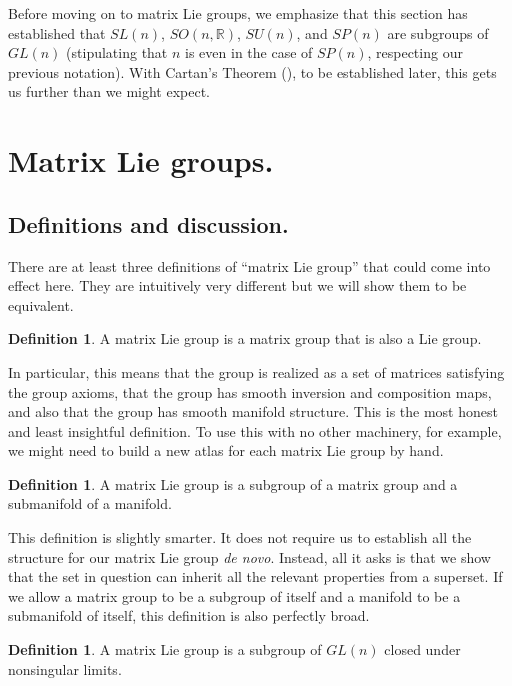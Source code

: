 \documentclass[12pt]{article}
\newcommand{\R}{\mathbb{R}}
\newcommand{\sun}{SU (n)}
\newcommand{\son}{SO (n, \R)}
\theoremstyle{definition}
\theoremstyle{definition}
\theoremstyle{definition}
\theoremstyle{definition}
\theoremstyle{definition}
\newtheorem{defn}[them]{Definition}
\theoremstyle{definition}
\theoremstyle{definition}
\theoremstyle{definition}
\begin{document}
\par{Before moving on to matrix Lie groups, we
emphasize that this section has established that
$SL(n)$, $\son$, $\sun$, and $SP(n)$ are
subgroups of $GL(n)$ (stipulating that $n$ is even
in the case of $SP(n)$, respecting our previous
notation). With Cartan’s Theorem (), to be
established later, this gets us further than
we might expect.}

\section{Matrix Lie groups.}

\subsection{Definitions and discussion.}

\par{There are at least three definitions of
“matrix Lie group” that could come into effect
here. They are intuitively very different but we
will show them to be equivalent.}

\begin{defn}\label{def1}
A matrix Lie group is a matrix group that is also
a Lie group.
\end{defn}

\par{In particular, this means that the group is
realized as a set of matrices satisfying the group
axioms, that the group has smooth inversion and
composition maps, and also that the group has
smooth manifold structure. This is the most honest
and least insightful definition. To use this with
no other machinery, for example, we might need to
build a new atlas for each matrix Lie group by
hand.}

\begin{defn}\label{def2} 
A matrix Lie group is a subgroup of a matrix group
and a submanifold of a manifold.
\end{defn} 

\par{This definition is slightly smarter. It does
not require us to establish all the structure for
our matrix Lie group \textit{de novo}. Instead,
all it asks is that we show that the set in
question can inherit all the relevant properties
from a superset. If we allow a matrix group to be a
subgroup of itself and a manifold to be a
submanifold of itself, this definition is also
perfectly broad.}

\begin{defn}\label{def3}
A matrix Lie group is a subgroup of $GL(n)$ closed
under nonsingular limits.
\end{defn}
\end{document}
